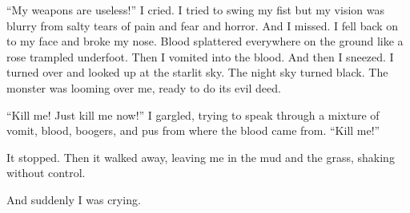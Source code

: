 ``My weapons are useless!'' I cried. I tried to swing my
fist but my vision was blurry from salty tears of pain and fear and
horror. And I missed. I fell back on to my face and broke my nose.
Blood splattered everywhere on the ground like a rose trampled
underfoot. Then I vomited into the blood. And then I sneezed. I
turned over and looked up at the starlit sky. The night sky turned
black. The monster was looming over me, ready to do its evil
deed.



``Kill me! Just kill me now!'' I gargled, trying to speak
through a mixture of vomit, blood, boogers, and pus from where the
blood came from. ``Kill me!''



It stopped. Then it walked away, leaving me in the mud and the
grass, shaking without control.



And suddenly I was crying. 
 



